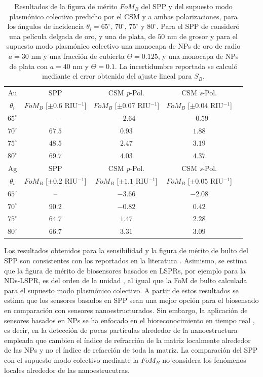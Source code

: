 \begin{table}[h!]
\centering
\caption{Resultados de la figura de mérito $\textit{FoM}_B$ del SPP y del supuesto modo  plasmónico colectivo predicho por el CSM y a ambas polarizaciones, para los ángulos de incidencia $\theta_i = 65^\circ,\,70^\circ,\, 75^\circ$ y $80^\circ$. Para el SPP de consideró una película delgada de oro, y una de plata, de $50$ nm de grosor y para el supuesto modo  plasmónico colectivo una monocapa de NPs de oro de radio $a=30$ nm y una fracción de cubierta $\Theta=0.125$, y una monocapa de NPs de plata con $a=40$ nm y $\Theta=0.1$. La incertidumbre reportada se calculó mediante el error obtenido del ajuste lineal para $S_B$.}\vspace*{-.7em}
\label{tab:FoM}\small
\begin{tabular}{c||c||ccc}
Au & SPP  & CSM \emph{p}-Pol. 	& CSM \emph{s}-Pol. \\ 
$\theta_i$ &  $\textit{FoM}_B$ [$\pm 0.6$ RIU$^{-1}$]	  &  $\textit{FoM}_B$ [$\pm 0.07$ RIU$^{-1}$]		&  $\textit{FoM}_B$  [$\pm 0.04$ RIU$^{-1}$]\\ \hline
$65^\circ$ & --			  &	$-2.64$ & $-0.59$\\
$70^\circ$ & $67.5$ &	$0.93$ & $1.88$\\
$75^\circ$ & $48.5$ &	$2.47$ & $3.19$\\
$80^\circ$ & $69.7$ &	$4.03$ & $4.37$\\
\hline \hline
Ag & SPP  & CSM \emph{p}-Pol. 	& CSM \emph{s}-Pol. \\ 
$\theta_i$ &  $\textit{FoM}_B$ [$\pm 0.2$ RIU$^{-1}$]	  &  $\textit{FoM}_B$ [$\pm 1.1$ RIU$^{-1}$]		&  $\textit{FoM}_B$  [$\pm 0.05$ RIU$^{-1}$]\\ \hline
$65^\circ$ & -- 			  &	$-3.66$ & $-2.08$\\
$70^\circ$ & $90.2$ &	$-0.82$ & $0.42$\\
$75^\circ$ & $64.7$ &	$1.47$  & $2.28$\\
$80^\circ$ & $66.7$ &	$3.31$  & $3.09$
\end{tabular}
\end{table}


Los resultados obtenidos para la sensibilidad y la figura de mérito de bulto del SPP son consistentes con los reportados en la literatura  \cite{estevez2014trends,danilov2018ultra,svedendahl2009refractometric}. Asimismo, se estima que la figura de mérito de biosensores basados en LSPRs, por ejemplo para la NDs-LSPR, es del orden de la unidad \cite{svedendahl2009refractometric}, al igual que la FoM de bulto calculada para el supuesto modo  plasmónico colectivo. A partir de estos resultados se estima que los sensores basados en SPP sean una mejor opción para el biosensado en comparación con sensores nanoestructurados. Sin embargo, la aplicación de sensores basados en NPs  se ha enfocado en el bioreconocimiento en tiempo real \cite{estevez2014trends,svedendahl2009refractometric}, es decir, en la detección de pocas partículas alrededor de la nanoestructura empleada que cambien el índice de refracción de la matriz localmente alrededor de las NPs y no el índice de refacción de toda la matriz. La comparación del SPP  con el supuesto modo colectivo mediante la $\textit{FoM}_B$ no considera los fenómenos locales alrededor de las nanoestrucutras.